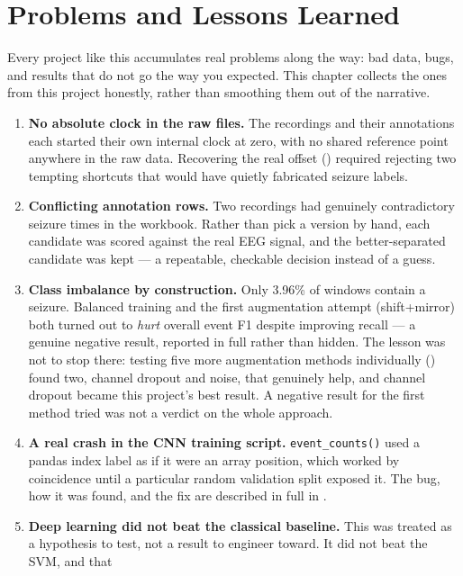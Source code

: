 \chapter{Problems and Lessons Learned}
\label{chap:lessons}

Every project like this accumulates real problems along the way: bad data, bugs, and results
that do not go the way you expected. This chapter collects the ones from this project
honestly, rather than smoothing them out of the narrative.

\begin{enumerate}[leftmargin=1.4em]
  \item \textbf{No absolute clock in the raw files.} The recordings and their annotations each
    started their own internal clock at zero, with no shared reference point anywhere in the raw
    data. Recovering the real offset () required rejecting two tempting
    shortcuts that would have quietly fabricated seizure labels.
  \item \textbf{Conflicting annotation rows.} Two recordings had genuinely contradictory seizure
    times in the workbook. Rather than pick a version by hand, each candidate was scored against
    the real EEG signal, and the better-separated candidate was kept --- a repeatable, checkable
    decision instead of a guess.
  \item \textbf{Class imbalance by construction.} Only 3.96\% of windows contain a seizure.
    Balanced training and the first augmentation attempt (shift+mirror) both turned out to
    \emph{hurt} overall event F1 despite improving recall --- a genuine negative result, reported
    in full rather than hidden. The lesson was not to stop there: testing five more augmentation
    methods individually () found two, channel dropout and noise, that
    genuinely help, and channel dropout became this project's best result. A negative result for
    the first method tried was not a verdict on the whole approach.
  \item \textbf{A real crash in the CNN training script.} \texttt{event\_counts()} used a pandas
    index label as if it were an array position, which worked by coincidence until a particular
    random validation split exposed it. The bug, how it was found, and the fix are described in
    full in .
  \item \textbf{Deep learning did not beat the classical baseline.} This was treated as a
    hypothesis to test, not a result to engineer toward. It did not beat the SVM, and that

\end{enumerate}
